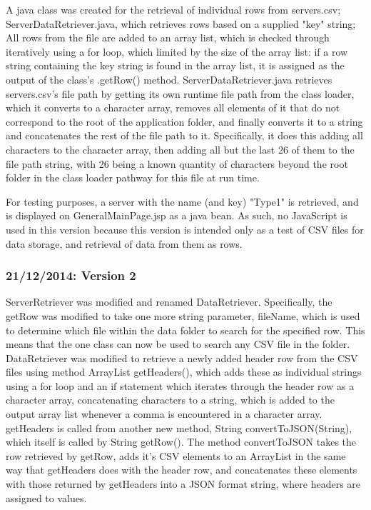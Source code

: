 A java class was created for the retrieval of individual rows from servers.csv; ServerDataRetriever.java, which retrieves rows based on a supplied "key" string; All rows from the file are added to an array list, which is checked through iteratively using a for loop, which limited by the size of the array list: if a row string containing the key string is found in the array list, it is assigned as the output of the class's .getRow() method. 
ServerDataRetriever.java retrieves servers.csv's file path by getting its own runtime file path from the class loader, which it converts to a character array, removes all elements of it that do not correspond to the root of the application folder, and finally converts it to a string and concatenates the rest of the file path to it. 
Specifically, it does this adding all characters to the character array, then adding all but the last 26 of them to the file path string, with 26 being a known quantity of characters beyond the root folder in the class loader pathway for this file at run time.

For testing purposes, a server with the name (and key) "Type1" is retrieved, and is displayed on General\textunderscore MainPage.jsp as a java bean. As such, no JavaScript is used in this version because this version is intended only as a test of CSV files for data storage, and retrieval of data from them as rows.

\subsubsection{21/12/2014: Version 2}
\label{subSubSection:Java and JSON: Lab 2}
ServerRetriever was modified and renamed DataRetriever. Specifically, the getRow was modified to take one more string parameter, fileName, which is used to determine which file within the data folder to search for the specified row. This means that the one class can now be used to search any CSV file in the folder. 
DataRetriever was modified to retrieve a newly added header row from the CSV files using method ArrayList getHeaders(), which adds these as individual strings using a for loop and an if statement which iterates through the header row as a character array, concatenating characters to a string, which is added to the output array list whenever a comma is encountered in a character array. 
getHeaders is called from another new method, String convertToJSON(String), which itself is called by String getRow(). The method convertToJSON takes the row retrieved by getRow, adds it's CSV elements to an ArrayList in the same way that getHeaders does with the header row, and concatenates these elements with those returned by getHeaders into a JSON format string, where headers are assigned to values. 


